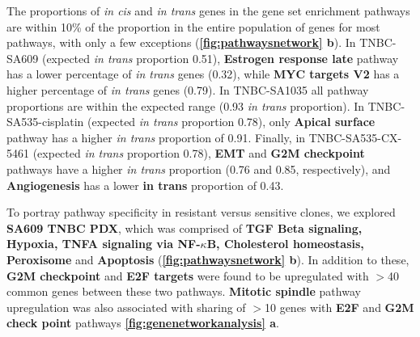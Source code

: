 


The proportions of \textit{in cis} and \textit{in trans} genes in the gene set enrichment pathways are within 10\% of the proportion in the entire population of genes for most pathways, with only a few exceptions (\textbf{\autoref{fig:pathwaysnetwork} b}). In TNBC-SA609 (expected \textit{in trans} proportion 0.51), \textbf{Estrogen response late} pathway has a lower percentage of \textit{in trans} genes (0.32), while \textbf{MYC targets V2} has a higher percentage of \textit{in trans} genes (0.79). In TNBC-SA1035 all pathway proportions are within the expected range (0.93 \textit{in trans} proportion). In TNBC-SA535-cisplatin (expected \textit{in trans} proportion 0.78), only \textbf{Apical surface} pathway has a higher \textit{in trans} proportion of 0.91. Finally, in TNBC-SA535-CX-5461 (expected \textit{in trans} proportion 0.78), \textbf{EMT} and \textbf{G2M checkpoint} pathways have a higher \textit{in trans} proportion (0.76 and 0.85, respectively), and \textbf{Angiogenesis} has a lower \textbf{in trans} proportion of 0.43.

To portray pathway specificity in resistant versus sensitive clones, we explored \textbf{SA609 TNBC PDX}, which was  comprised of \textbf{TGF Beta signaling, Hypoxia, TNFA signaling via NF-$\kappa$B, Cholesterol homeostasis, Peroxisome} and \textbf{Apoptosis} (\textbf{\autoref{fig:pathwaysnetwork} b}). In addition to these, \textbf{G2M checkpoint} and \textbf{E2F targets} were found to be upregulated with $>$40 common genes between these two pathways. \textbf{Mitotic spindle} pathway upregulation was also associated with sharing of $>$10 genes with \textbf{E2F} and \textbf{G2M check point} pathways \textbf{\autoref{fig:genenetworkanalysis} a}.

